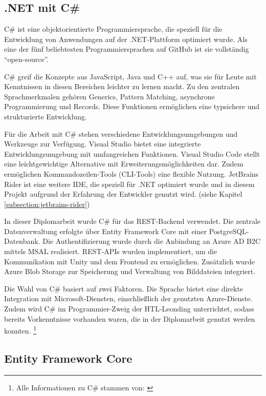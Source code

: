 \subsection{.NET mit C\#}

C\# ist eine objektorientierte Programmiersprache, die speziell für die Entwicklung von 
Anwendungen auf der .NET-Plattform optimiert wurde. Als eine der fünf beliebtesten 
Programmiersprachen auf GitHub ist sie vollständig ``open-source''.

C\# greif die Konzepte aus JavaScript, Java und C++ auf, was sie für Leute mit Kenntnissen
in diesen Bereichen leichter zu lernen macht. Zu den zentralen Sprachmerkmalen gehören Generics, 
Pattern Matching, asynchrone Programmierung und Records. Diese Funktionen ermöglichen eine 
typsichere und strukturierte Entwicklung.

Für die Arbeit mit C\# stehen verschiedene Entwicklungsumgebungen und Werkzeuge zur Verfügung. 
Visual Studio bietet eine integrierte Entwicklungsumgebung mit umfangreichen Funktionen. 
Visual Studio Code stellt eine leichtgewichtige Alternative mit Erweiterungsmöglichkeiten 
dar. Zudem ermöglichen Kommandozeilen-Tools (CLI-Tools) eine flexible Nutzung. JetBrains Rider 
ist eine weitere IDE, die speziell für .NET optimiert wurde und in diesem Projekt
aufgrund der Erfahrung der Entwickler genutzt wird. (siehe Kapitel \ref{subsection:jetbrains-rider})

In dieser Diplomarbeit wurde C\# für das REST-Backend verwendet. Die zentrale Datenverwaltung 
erfolgte über Entity Framework Core mit einer PostgreSQL-Datenbank. Die Authentifizierung 
wurde durch die Anbindung an Azure AD B2C mittels MSAL realisiert. REST-APIs wurden implementiert, 
um die Kommunikation mit Unity und dem Frontend zu ermöglichen. Zusätzlich wurde Azure Blob 
Storage zur Speicherung und Verwaltung von Bilddateien integriert.

Die Wahl von C\# basiert auf zwei Faktoren. Die Sprache bietet eine direkte Integration mit 
Microsoft-Diensten, einschließlich der genutzten Azure-Dienste. Zudem wird C\# im 
Programmier-Zweig der HTL-Leonding unterrichtet, sodass bereits Vorkenntnisse vorhanden 
waren, die in der Diplomarbeit genutzt werden konnten.
\footnote{Alle Informationen zu C\# stammen von: \cite{MicrosoftCorporationo}}

\subsection{Entity Framework Core}

